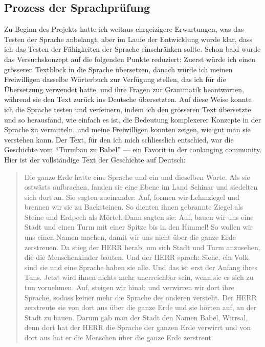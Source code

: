 \documentclass{article}
\begin{document}
\subsection{Prozess der Sprachprüfung}
Zu Beginn des Projekts hatte ich weitaus ehrgeizigere Erwartungen, was das Testen der Sprache anbelangt,
aber im Laufe der Entwicklung wurde klar, dass ich das Testen der Fähigkeiten der Sprache einschränken sollte.
Schon bald wurde das Versuchskonzept auf die folgenden Punkte reduziert: Zuerst würde ich einen grösseren Textblock in die
Sprache übersetzen, danach würde ich meinen Freiwilligen dasselbe Wörterbuch zur Verfügung stellen, das ich für die Übersetzung
verwendet hatte, und ihre Fragen zur Grammatik beantworten, während sie den Text zurück ins Deutsche übersetzten.
Auf diese Weise konnte ich die Sprache testen und verfeinern, indem ich den grösseren Text übersetzte und so herausfand,
wie einfach es ist, die Bedeutung komplexerer Konzepte in der Sprache zu vermitteln, und meine Freiwilligen konnten zeigen,
wie gut man sie verstehen kann. Der Text, für den ich mich schliesslich entschied, war die Geschichte vom ``Turmbau zu Babel''
--- ein Favorit in der conlanging community. Hier ist der vollständige Text der Geschichte auf Deutsch:

\begin{quotation}
    Die ganze Erde hatte eine Sprache und ein und dieselben Worte.
    Als sie ostwärts aufbrachen, fanden sie eine Ebene im Land Schinar und siedelten sich dort an.
    Sie sagten zueinander: Auf, formen wir Lehmziegel und brennen wir sie zu Backsteinen.
    So dienten ihnen gebrannte Ziegel als Steine und Erdpech als Mörtel.
    Dann sagten sie: Auf, bauen wir uns eine Stadt und einen Turm mit einer Spitze bis in den Himmel!
    So wollen wir uns einen Namen machen, damit wir uns nicht über die ganze Erde zerstreuen.
    Da stieg der HERR herab, um sich Stadt und Turm anzusehen, die die Menschenkinder bauten.
    Und der HERR sprach: Siehe, ein Volk sind sie und eine Sprache haben sie alle.
    Und das ist erst der Anfang ihres Tuns. Jetzt wird ihnen nichts mehr unerreichbar sein, wenn sie es sich zu tun vornehmen.
    Auf, steigen wir hinab und verwirren wir dort ihre Sprache, sodass keiner mehr die Sprache des anderen versteht.
    Der HERR zerstreute sie von dort aus über die ganze Erde und sie hörten auf, an der Stadt zu bauen.
    Darum gab man der Stadt den Namen Babel, Wirrsal, denn dort hat der HERR die Sprache der ganzen Erde
    verwirrt und von dort aus hat er die Menschen über die ganze Erde zerstreut.\citep{Bibel2020}
\end{quotation}
\end{document}
